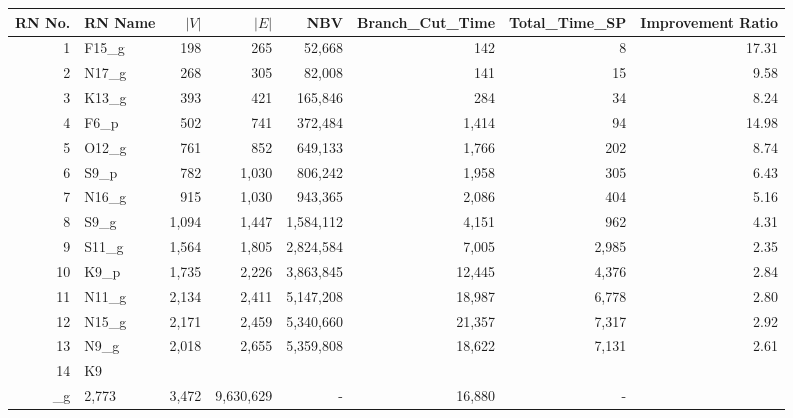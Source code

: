 \begin{tabular}{rlrrrrrr}
\toprule
RN No. & RN Name & $|V|$ & $|E|$ & NBV & Branch_Cut_Time & Total_Time_SP & Improvement Ratio \\
\midrule
1 & F15\_g & 198 & 265 & 52,668 & 142 & 8 & 17.31 \\
2 & N17\_g & 268 & 305 & 82,008 & 141 & 15 & 9.58 \\
3 & K13\_g & 393 & 421 & 165,846 & 284 & 34 & 8.24 \\
4 & F6\_p & 502 & 741 & 372,484 & 1,414 & 94 & 14.98 \\
5 & O12\_g & 761 & 852 & 649,133 & 1,766 & 202 & 8.74 \\
6 & S9\_p & 782 & 1,030 & 806,242 & 1,958 & 305 & 6.43 \\
7 & N16\_g & 915 & 1,030 & 943,365 & 2,086 & 404 & 5.16 \\
8 & S9\_g & 1,094 & 1,447 & 1,584,112 & 4,151 & 962 & 4.31 \\
9 & S11\_g & 1,564 & 1,805 & 2,824,584 & 7,005 & 2,985 & 2.35 \\
10 & K9\_p & 1,735 & 2,226 & 3,863,845 & 12,445 & 4,376 & 2.84 \\
11 & N11\_g & 2,134 & 2,411 & 5,147,208 & 18,987 & 6,778 & 2.80 \\
12 & N15\_g & 2,171 & 2,459 & 5,340,660 & 21,357 & 7,317 & 2.92 \\
13 & N9\_g & 2,018 & 2,655 & 5,359,808 & 18,622 & 7,131 & 2.61 \\
14 & K9\\_g & 2,773 & 3,472 & 9,630,629 & - & 16,880 & - \\
\bottomrule
\end{tabular}
